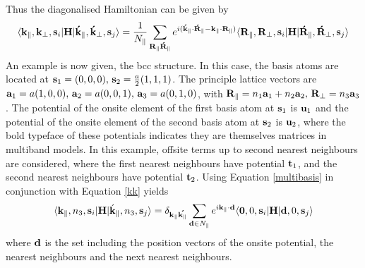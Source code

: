\documentclass[a4paper, 12pt]{article}
\begin{document}
	Thus the diagonalised Hamiltonian can be given by 
	\begin{equation}\label{multibasis}
		\langle{\bf k}_\parallel, {\bf k}_\perp, {\bf s}_i|{\bf H}|{\bf \acute{k}}_\parallel, {\bf \acute{k}}_\perp, {\bf s}_j\rangle = \frac{1}{N_\parallel}\sum_{\bf R_\parallel \acute{R}_\parallel}  e^{i({\bf \acute{k}}_\parallel\cdot {\bf \acute{R}}_\parallel-{\bf k}_\parallel\cdot {\bf R}_\parallel)} \langle{\bf R}_\parallel,{\bf R}_\perp, {\bf s}_i|{\bf H}|{\bf \acute{R}}_\parallel,{\bf \acute{R}}_\perp, {\bf s}_j \rangle
	\end{equation}
	An example is now given, the \gls{bcc} structure.
	In this case, the basis atoms are located at ${\bf s}_1=(0,0,0), \, {\bf s}_2=\frac{a}{2}(1,1,1)$.
	The principle lattice vectors are ${\bf a}_1 = a(1,0,0), \, {\bf a}_2 = a(0,0,1), \, {\bf a}_3 = a(0,1,0)$,
	with ${\bf R}_\parallel = n_1{\bf a}_1 + n_2{\bf a}_2, \, {\bf R}_\perp = n_3 {\bf a}_3$.
	The potential of the onsite element of the first basis atom at ${\bf s}_1$ is ${\bf u}_1$ and the potential of the onsite element of the second basis atom at ${\bf s}_2$ is ${\bf u}_2$,
	where the bold typeface of these potentials indicates they are themselves matrices in multiband models.
	In this example, offsite terms up to second nearest neighbours are considered, where the first nearest neighbours have potential ${\bf t}_1$, and the second nearest neighbours have potential ${\bf t}_2$.
	Using Equation \eqref{multibasis} in conjunction with Equation \eqref{kk} yields
	\begin{equation}
		\langle{\bf k}_\parallel, n_3, {\bf s}_i|{\bf H}|\acute{\bf k}_\parallel, n_3, {\bf s}_j\rangle = \delta_{\bf k_\parallel\acute{k_\parallel}}\sum_{{\bf d}\in N_\parallel}e^{i\bf k_\parallel \cdot d}\langle{\bf 0}, 0, {\bf s}_i|{\bf H}|{\bf d}, 0, {\bf s}_j\rangle
	\end{equation}
	where $\bf d$ is the set including the position vectors of the onsite potential, the nearest neighbours and the next nearest neighbours.
\end{document}
